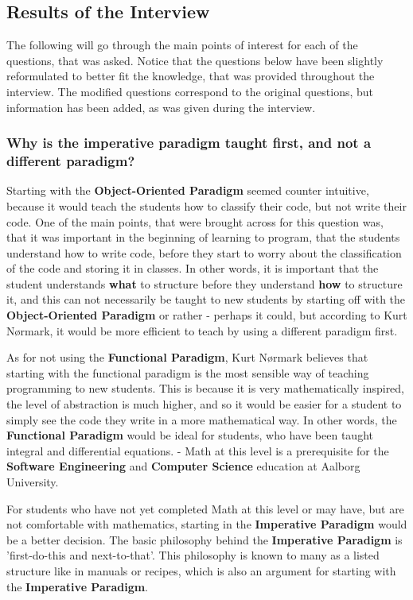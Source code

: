 \subsection{Results of the Interview}
The following will go through the main points of interest for each of the questions, that was asked.
Notice that the questions below have been slightly reformulated to better fit the knowledge, that was provided throughout the interview.
The modified questions correspond to the original questions, but information has been added, as was given during the interview.

\subsubsection{Why is the imperative paradigm taught first, and not a different paradigm?}

Starting with the \textbf{Object-Oriented Paradigm} seemed counter intuitive, because it would teach the students how to classify their code, but not write their code.
One of the main points, that were brought across for this question was, that it was important in the beginning of learning to program, that the students understand how to write code, before they start to worry about the classification of the code and storing it in classes.
In other words, it is important 
that the student understands \textbf{what} to structure before they understand \textbf{how} to structure it, and this can not necessarily be taught to new students by starting off with the \textbf{Object-Oriented Paradigm} or rather - perhaps it could, but according to Kurt N{\o}rmark, it would be more efficient to teach by using a different paradigm first.\newline

As for not using the \textbf{Functional Paradigm}, Kurt N{\o}rmark believes that starting with the functional paradigm is the most sensible way of teaching programming to new students. This is because it is very mathematically inspired, the level of abstraction is much higher, and so it would be easier for a student to simply see the code they write in a more mathematical way.
In other words, the \textbf{Functional Paradigm} would be ideal for students, who have been taught integral and differential equations.
 - Math at this level is a prerequisite for the \textbf{Software Engineering} and \textbf{Computer Science} education at Aalborg University.\cite{UG}\newline

For students who have not yet completed Math at this level or may have, but are not comfortable with mathematics, starting in the \textbf{Imperative Paradigm} would be a better decision.
The basic philosophy behind the \textbf{Imperative Paradigm} is 'first-do-this and next-to-that'.
This philosophy is known to many as a listed structure like in manuals or recipes, which is also an argument for starting with the \textbf{Imperative Paradigm}.

